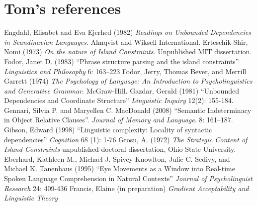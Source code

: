 \documentclass[a4paper]{article}
\begin{document}
{\sloppy
\printbibliography[heading=subbibliography,notkeyword=this] 
}

\section*{Tom's references}
Engdahl, Elisabet and Eva Ejerhed (1982) {\it Readings on Unbounded Dependencies in Scandinavian Languages}.  Almqvist and Wiksell International.
\newline
\newline
Erteschik-Shir, Nomi (1973) {\it On the nature of Island Constraints}.  Unpublished MIT dissertation.
\newline
\newline
Fodor, Janet D. (1983) ``Phrase structure parsing and the island constraints''
{\it Linguistics and
Philosophy}
6: 163–223
\newline
\newline
Fodor, Jerry, Thomas Bever, and Merrill Garrett (1974) {\it The Psychology of Language: An Introduction to Psycholinguistics and Generative Grammar}.  McGraw-Hill.
\newline
\newline
Gazdar, Gerald (1981) ``Unbounded Dependencies and Coordinate Structure'' {\it Linguistic Inquiry} 12(2): 155-184.
\newline
\newline
Gennari, Silvia P. and Maryellen C. MacDonald (2008) ``Semantic Indeterminacy in Object Relative Clauses''.  {\it Journal of Memory and Language}.  8: 161–187.
\newline
\newline
Gibson, Edward (1998)
``Linguistic complexity: Locality of syntactic dependencies''
{\it Cognition} 68 (1): 1-76
\newline
\newline
 Grosu, A. (1972) {\it The Strategic Content of Island Constraints}
 unpublished doctoral dissertation, Ohio State University.
\newline
\newline
Eberhard, Kathleen M., Michael J. Spivey-Knowlton, Julie C. Sedivy, and Michael K. Tanenhaus (1995) ``Eye Movements as a Window into Real-time Spoken Language Comprehension in Natural Contexts'' {\it Journal of Psycholinguist Research} 24: 409-436
\newline
\newline
Francis, Elaine (in preparation) {\it Gradient Acceptability and Linguistic Theory}
\newline
\end{document}
